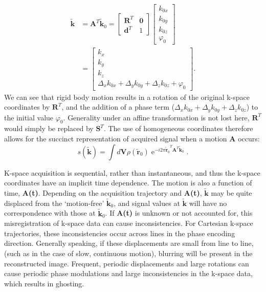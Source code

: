 \documentclass[class=article, crop=false]{standalone}
\begin{document}
\begin{equation} \label{eq4}
	\begin{split}
		\tilde{\textbf{k}} & = \textbf{A}^T\tilde{\textbf{k}}_0
		= \begin{bmatrix}\textbf{R}^T & \textbf{0} \\ \textbf{d}^T & 1\end{bmatrix}\begin{bmatrix}k_{0x}\\k_{0y}\\k_{0z}\\\varphi_0\end{bmatrix}\\
		& = \begin{bmatrix}k_{x}\\k_{y}\\k_{z}\\\Delta_{x}k_{0x} + \Delta_{y}k_{0y} + \Delta_{z}k_{0z} + \varphi_0\end{bmatrix}.
	\end{split}
\end{equation}
We can see that rigid body motion results in a rotation of the original k-space coordinates by $\textbf{R}^T$, and the addition of a phase term ($\Delta_{x}k_{0x} + \Delta_{y}k_{0y} + \Delta_{z}k_{0z}$) to the initial value $\varphi_0$. Generality under an affine transformation is not lost here, $\textbf{R}^T$ would simply be replaced by $\textbf{S}^T$. The use of homogeneous coordinates therefore allows for the succinct representation of acquired signal when a motion \textbf{A} occurs:
\begin{equation} \label{eq5}
s(\tilde{\textbf{k}}) = \int d\textbf{V} \rho\left(\tilde{\textbf{r}}_0\right)\operatorname{e}^{-i2\pi{\tilde{\textbf{r}}_0}^{T}\textbf{A}^T\tilde{\textbf{k}}_0}.
\end{equation}
\par
K-space acquisition is sequential, rather than instantaneous, and thus the k-space coordinates have an implicit time dependence. The motion is also a function of time, \textbf{A(t)}. Depending on the acquisition trajectory and \textbf{A(t)}, $\tilde{\textbf{k}}$ may be quite displaced from the `motion-free' $\tilde{\textbf{k}}_0$, and signal values at $\tilde{\textbf{k}}$ will have no correspondence with those at $\tilde{\textbf{k}}_0$. If \textbf{A(t)} is unknown or not accounted for, this misregistration of k-space data can cause inconsistencies. For Cartesian k-space trajectories, these inconsistencies occur across lines in the phase encoding direction. Generally speaking, if these displacements are small from line to line, (such as in the case of slow, continuous motion), blurring will be present in the reconstructed image. Frequent, periodic displacements and large rotations can cause periodic phase modulations and large inconsistencies in the k-space data, which results in ghosting.
\end{document}
